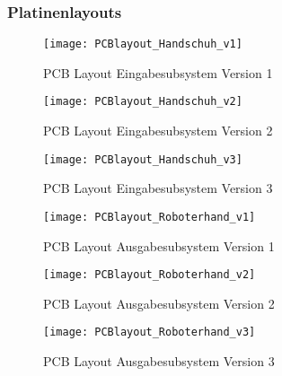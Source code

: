 \documentclass[titlepage,12pt,twoside]{article}
\begin{document}
\subsubsection{Platinenlayouts}
\begin{figure}[H]
	\begin{center}
		\scalebox{1.2}
		{\texttt{[image: PCBlayout\_Handschuh\_v1]}}
		\caption{PCB Layout Eingabesubsystem Version 1}
		\label{fig:PCBlayout_Handschuh_v1}		
	\end{center}
\end{figure}
\pagebreak
\begin{figure}[H]
	\begin{center}
		\scalebox{1.2}
		{\texttt{[image: PCBlayout\_Handschuh\_v2]}}
		\caption{PCB Layout Eingabesubsystem Version 2}
		\label{fig:PCBlayout_Handschuh_v2}		
	\end{center}
\end{figure}
\pagebreak
\begin{figure}[H]
	\begin{center}
		\scalebox{1.2}
		{\texttt{[image: PCBlayout\_Handschuh\_v3]}}
		\caption{PCB Layout Eingabesubsystem Version 3}
		\label{fig:PCBlayout_Handschuh_v3}		
	\end{center}
\end{figure}
\pagebreak
\begin{figure}[H]
	\begin{center}
		\scalebox{1.2}
		{\texttt{[image: PCBlayout\_Roboterhand\_v1]}}
		\caption{PCB Layout Ausgabesubsystem Version 1}
		\label{fig:PCBlayout_Roboterhand_v1}		
	\end{center}
\end{figure}
\pagebreak
\begin{figure}[H]
	\begin{center}
		\scalebox{1.2}
		{\texttt{[image: PCBlayout\_Roboterhand\_v2]}}
		\caption{PCB Layout Ausgabesubsystem Version 2}
		\label{fig:PCBlayout_Roboterhand_v2}		
	\end{center}
\end{figure}
\pagebreak
\begin{figure}[H]
	\begin{center}
		\scalebox{1.2}
		{\texttt{[image: PCBlayout\_Roboterhand\_v3]}}
		\caption{PCB Layout Ausgabesubsystem Version 3}
		\label{fig:PCBlayout_Roboterhand_v3}		
	\end{center}
\end{figure}
\end{document}
